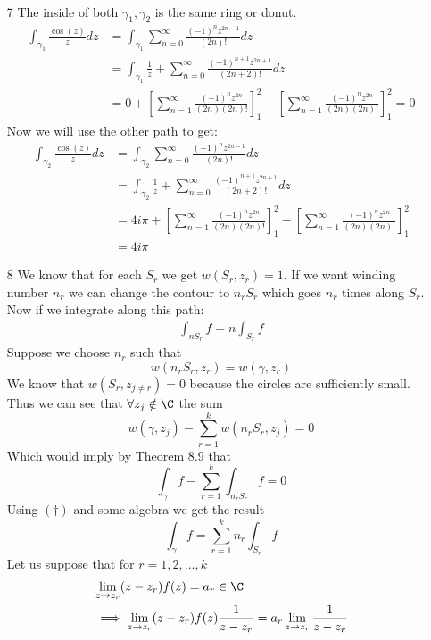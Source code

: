 \documentclass{article}
\begin{document}
\begin{enumerate}
\begin{align*}
      \end{align*}
    \item[7]
      The inside of both $\gamma_1,\gamma_2$ is the same ring or donut.\\
      \begin{align*}
        \int_{\gamma_1}\frac{\cos(z)}{z}dz&=\int_{\gamma_1}\sum_{n=0}^\infty\frac{(-1)^nz^{2n-1}}{(2n)!}dz\\
        &=\int_{\gamma_1}\frac{1}{z}+\sum_{n=0}^\infty\frac{(-1)^{n+1}z^{2n+1}}{(2n+2)!}dz\\
        &=0+\left[\sum_{n=1}^\infty\frac{(-1)^{n}z^{2n}}{(2n)(2n)!}\right]_1^2-\left[\sum_{n=1}^\infty\frac{(-1)^{n}z^{2n}}{(2n)(2n)!}\right]_1^2=0
      \end{align*}
      Now we will use the other path to get:
      \begin{align*}
        \int_{\gamma_2}\frac{\cos(z)}{z}dz&=\int_{\gamma_2}\sum_{n=0}^\infty\frac{(-1)^nz^{2n-1}}{(2n)!}dz\\
        &=\int_{\gamma_2}\frac{1}{z}+\sum_{n=0}^\infty\frac{(-1)^{n+1}z^{2n+1}}{(2n+2)!}dz\\
        &=4i\pi+\left[\sum_{n=1}^\infty\frac{(-1)^{n}z^{2n}}{(2n)(2n)!}\right]_1^2-\left[\sum_{n=1}^\infty\frac{(-1)^{n}z^{2n}}{(2n)(2n)!}\right]_1^2\\
        &=4i\pi
      \end{align*}
    \item[8]
      We know that for each $S_r$ we get $w(S_r,z_r)=1$. If we want winding number $n_r$ we can change the contour to $n_rS_r$ which goes $n_r$ times along $S_r$. Now if we integrate along this path:
      \begin{align*}
        \int_{nS_r}f=n\int_{S_r}f\tag{$\dagger$}
      \end{align*}
      Suppose we choose $n_r$ such that
      \[w(n_rS_r,z_r)=w(\gamma,z_r)\]
      We know that $w(S_r,z_{j\neq r})=0$ because the circles are sufficiently small. Thus we can see that $\forall z_j\notin\C$ the sum
      \[w(\gamma,z_j)-\sum_{r=1}^kw(n_rS_r,z_j)=0\]
      Which would imply by Theorem 8.9 that
      \[\int_\gamma f-\sum_{r=1}^k\int_{n_rS_r}f=0\]
      Using $(\dagger)$ and some algebra we get the result
      \[\int_\gamma f=\sum_{r=1}^kn_r\int_{S_r}f\]
      Let us suppose that for $r=1,2,...,k$
      \begin{align*}
        &\lim_{z\to z_r}(z-z_r)f(z)=a_r\in\C\\
        &\implies\lim_{z\to z_r}(z-z_r)f(z)\frac{1}{z-z_r}=a_r\lim_{z\to z_r}\frac{1}{z-z_r}\\

\end{align*}
\end{enumerate}
\end{document}
